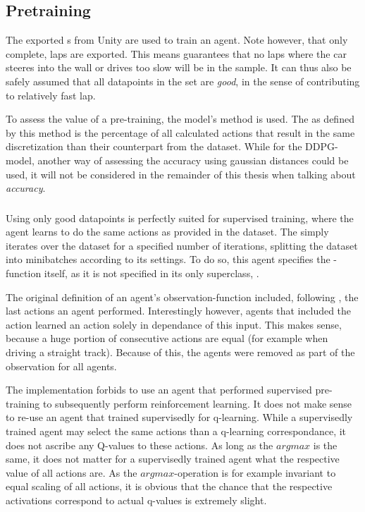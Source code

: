 \subsection{Pretraining}

\label{sec:pretrainingcode}

The exported s from Unity are used to train an agent. Note however, that only complete,  laps are exported. This means guarantees that no laps where the car steeres into the wall or drives too slow will be in the sample. It can thus also be safely assumed that all datapoints in the set are \textit{good}, in the sense of contributing to relatively fast lap. 

To assess the value of a pre-training, the model's method  is used. The  as defined by this method is the percentage of all calculated actions that result in the same discretization than their counterpart from the dataset. While for the DDPG-model, another way of assessing the accuracy using gaussian distances could be used, it will not be considered in the remainder of this thesis when talking about \textit{accuracy}.

\subsubsection{}

Using only good datapoints is perfectly suited for supervised training, where the agent learns to do the same actions as provided in the dataset. The  simply iterates over the dataset for a specified number of iterations, splitting the dataset into minibatches according to its settings. To do so, this agent specifies the -function itself, as it is not specified in its only superclass, .

The original definition of an agent's observation-function included, following \cite{mnih_human-level_2015}, the last actions an agent performed. Interestingly however, agents that included the action learned an action solely in dependance of this input. This makes sense, because a huge portion of consecutive actions are equal (for example when driving a straight track). Because of this, the agents were removed as part of the observation for all agents.

The implementation forbids to use an agent that performed supervised pre-training to subsequently perform reinforcement learning. It does not make sense to re-use an agent that trained supervisedly for q-learning. While a supervisedly trained agent may select the same actions than a q-learning correspondance, it does not ascribe any Q-values to these actions. As long as the $argmax$ is the same, it does not matter for a supervisedly trained agent what the respective value of all actions are. As the $argmax$-operation is for example invariant to equal scaling of all actions, it is obvious that the chance that the respective activations correspond to actual q-values is extremely slight.

